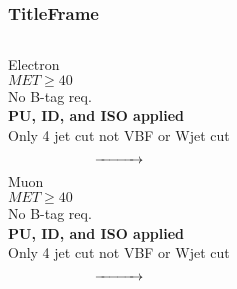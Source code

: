 \begin{frame}\frametitle{TitleFrame}
	\begin{columns}[T]
			\tiny{
			Electron\\$MET\ge40$\\No B-tag req.\\{\bf PU, ID, and ISO applied}\\Only 4 jet cut not VBF or Wjet cut}\\
			\[ \xrightarrow{\hspace*{1cm}} \]
			\tiny{
			Muon\\$MET\ge40$\\No B-tag req.\\{\bf PU, ID, and ISO applied}\\Only 4 jet cut not VBF or Wjet cut}\\
			\[ \xrightarrow{\hspace*{1cm}} \]


\end{columns}
\end{frame}
